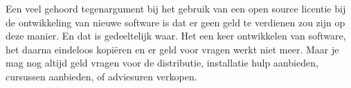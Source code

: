 Een veel gehoord tegenargument bij het gebruik van een open source licentie bij de ontwikkeling
van nieuwe software is dat er geen geld te verdienen zou zijn op deze manier. En dat is gedeeltelijk waar. Het een keer
ontwikkelen van software, het daarna eindeloos kopi\"eren en er geld voor vragen werkt niet meer. Maar je mag nog
altijd geld vragen voor de distributie, installatie hulp aanbieden, cursussen aanbieden, of adviesuren verkopen.
